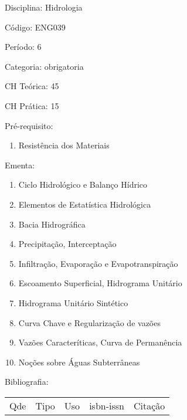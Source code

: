 \documentclass[12pt,a4paper,twoside]{report}
\begin{document}
Disciplina: Hidrologia

Código: ENG039

Período: 6

Categoria: obrigatoria

CH Teórica: 45

CH Prática: 15




Pré-requisito:
\begin{enumerate}
\item Resistência dos Materiais
\end{enumerate}

Ementa:
\begin{enumerate}
\item Ciclo Hidrológico e Balanço Hídrico
\item Elementos de Estatística Hidrológica
\item Bacia Hidrográfica
\item Precipitação, Interceptação
\item Infiltração, Evaporação e Evapotranspiração
\item Escoamento Superficial, Hidrograma Unitário
\item Hidrograma Unitário Sintético
\item Curva Chave e Regularização de vazões
\item Vazões Caracteríticas, Curva de Permanência
\item Noções sobre Águas Subterrâneas
\end{enumerate}



Bibliografia:


\begin{tabular}{llllp{8cm}}
Qde & Tipo & Uso & isbn-issn & Citação \\
\end{tabular}
\end{document}
